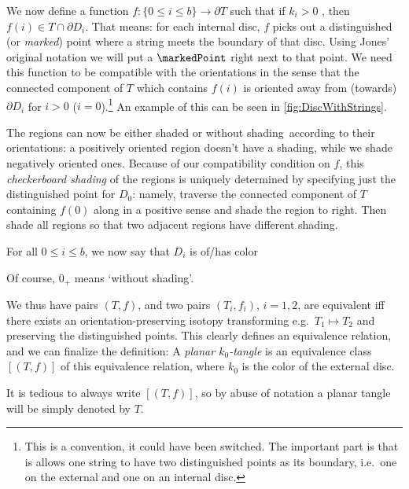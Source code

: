 \begin{definition}
We now define a function $f:\{0\leq i \leq b\}\rightarrow \partial T$  such that if $k_i>0$ , then $f(i)\in T\cap \partial D_i$. That means: for each internal disc, $f$ picks out a distinguished (or \emph{marked}) point where a string meets the boundary of that disc. Using Jones' original notation we will put a $\markedPoint$ right next to that point. We need this function to be compatible with the orientations in the sense that the connected component of $T$ which contains $f(i)$ is oriented away from (towards) $\partial D_i$ for $i>0$ ($i=0$).\footnote{This is a convention, it could have been switched. The important part is that is allows one string to have two distinguished points as its boundary, i.e.\ one on the external and one on an internal disc.} An example of this can be seen in \ref{fig:DiscWithStrings}.

The regions can now be either shaded or without shading\footnotemark\, according to their orientations: a positively oriented region doesn't have a shading, while we shade negatively oriented ones. Because of our compatibility condition on $f$, this \emph{checkerboard shading} of the regions is uniquely determined by specifying just the  distinguished point for $D_0$: namely, traverse the connected component of $T$ containing $f(0)$ along in a positive sense and shade the region to right. Then shade all regions so that two adjacent regions have different shading.

For all $0\leq i \leq b$, we now say that $D_i$ is of/has color


\noindent Of course, $0_+$ means `without shading'.%

We thus have pairs $(T,f)$, and two pairs $(T_i,f_i)$, $i=1,2$, are equivalent iff there exists an orientation-preserving isotopy transforming e.g.\ $T_1\mapsto T_2$ and preserving the distinguished points. This clearly defines an equivalence relation, and we can finalize the definition:
A \emph{planar $k_0$-tangle} is an equivalence class $[(T,f)]$ of this equivalence relation, where $k_0$ is the color of the external disc.
\end{definition}
It is tedious to always write $[(T,f)]$, so by abuse of notation a planar tangle will be simply denoted by $T$.

